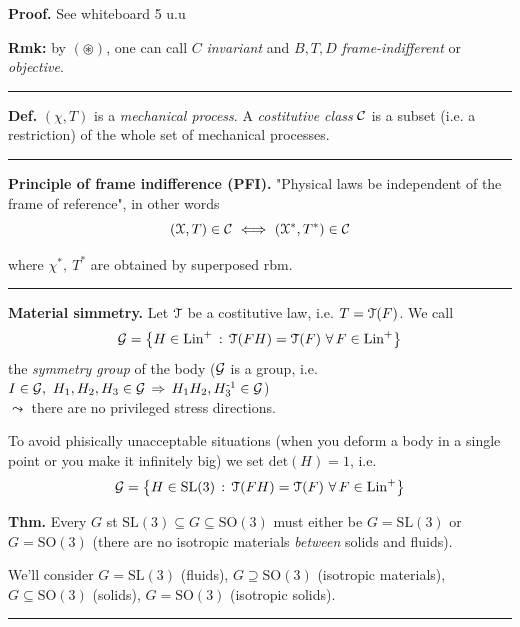\textbf{\color{lavender(floral)}Proof.} See whiteboard 5 u.u

\smallskip

\textbf{Rmk:} by $(\circledast)$, one can call $C$ \emph{invariant} and $B,T,D$ \emph{frame-indifferent} or \emph{objective}.

\rule{0.31\textwidth}{0.2pt}
\smallskip

\textbf{Def.} $(\chi,T)$ is a \emph{mechanical process}. A \emph{costitutive class} $\mathcal{C}$ is a subset (i.e. a restriction) of the whole set of mechanical processes.

\rule{0.31\textwidth}{0.2pt}
\smallskip

\textbf{Principle of frame indifference (PFI).} "Physical laws be independent of the frame of reference", in other words
\begin{equation*}
(\chi,T)\in\Cc\ \Longleftrightarrow\ (\chi^*,T^*)\in\Cc  
\end{equation*}

where $\chi^*,\ T^*$ are obtained by superposed rbm.

\rule{0.31\textwidth}{0.2pt}
\smallskip

\textbf{Material simmetry.} Let $\EuScript{T}$ be a costitutive law, i.e. $T=\EuScript{T}(F)$. We call
\begin{equation*}
\Gc=\left\{ H\in\text{Lin}^+\,:\,\ti(FH)=\ti(F)\ \forall\, F\in \text{Lin}^+ \right\}
\end{equation*}
the \emph{symmetry group} of the body ($\mathcal{G}$ is a group, i.e. $I\in \mathcal{G},\ H_1,H_2,H_3\in \mathcal{G}\,\Rightarrow\,H_1H_2,H_3^{\text{-}1}\in \mathcal{G}$) \\ $\leadsto$ there are no privileged stress directions.

\smallskip 

To avoid phisically unacceptable situations (when you deform a body in a single point or you make it infinitely big) we set $\text{det}(H)=1$, i.e.
\begin{equation*}
\mathcal{G}=\left\{ H\in\text{SL}(3)\,:\,\EuScript{T}(FH)=\EuScript{T}(F)\ \forall\, F\in \text{Lin}^+ \right\}
\end{equation*}

\textbf{Thm.} Every $G$ st $\text{SL}(3)\subseteq G \subseteq \text{SO}(3)$ must either be $G=\text{SL}(3)$ or $G=\text{SO}(3)$ (there are no isotropic materials \emph{between} solids and fluids).

\smallskip

We'll consider $G=\text{SL}(3)$ (fluids), $G\supseteq\text{SO}(3)$ (isotropic materials), $G\subseteq \text{SO}(3)$ (solids), $G=\text{SO}(3)$ (isotropic solids).   

\rule{0.31\textwidth}{1pt}

